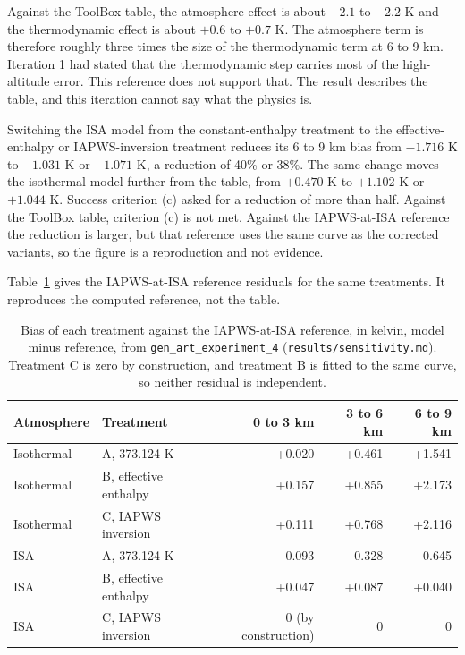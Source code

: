 \documentclass[11pt,letterpaper]{article}
\begin{document}
Against the ToolBox table, the atmosphere effect is about $-2.1$ to $-2.2$ K and the thermodynamic effect is about $+0.6$ to $+0.7$ K. The atmosphere term is therefore roughly three times the size of the thermodynamic term at 6 to 9 km. Iteration 1 had stated that the thermodynamic step carries most of the high-altitude error. This reference does not support that. The result describes the table, and this iteration cannot say what the physics is.

Switching the ISA model from the constant-enthalpy treatment to the effective-enthalpy or IAPWS-inversion treatment reduces its 6 to 9 km bias from $-1.716$ K to $-1.031$ K or $-1.071$ K, a reduction of 40\% or 38\%. The same change moves the isothermal model further from the table, from $+0.470$ K to $+1.102$ K or $+1.044$ K. Success criterion (c) asked for a reduction of more than half. Against the ToolBox table, criterion (c) is not met. Against the IAPWS-at-ISA reference the reduction is larger, but that reference uses the same curve as the corrected variants, so the figure is a reproduction and not evidence.

Table~\ref{tab:t11} gives the IAPWS-at-ISA reference residuals for the same treatments. It reproduces the computed reference, not the table.

\begin{table}[!htbp]
\centering\small
\caption{Bias of each treatment against the IAPWS-at-ISA reference, in kelvin, model minus reference, from \texttt{gen\_art\_experiment\_4} (\texttt{results/sensitivity.md}). Treatment C is zero by construction, and treatment B is fitted to the same curve, so neither residual is independent.}\label{tab:t11}
\begin{tabular}{llrrr}
\toprule
Atmosphere & Treatment & 0 to 3 km & 3 to 6 km & 6 to 9 km \\
\midrule
Isothermal & A, 373.124 K & +0.020 & +0.461 & +1.541 \\
Isothermal & B, effective enthalpy & +0.157 & +0.855 & +2.173 \\
Isothermal & C, IAPWS inversion & +0.111 & +0.768 & +2.116 \\
ISA & A, 373.124 K & -0.093 & -0.328 & -0.645 \\
ISA & B, effective enthalpy & +0.047 & +0.087 & +0.040 \\
ISA & C, IAPWS inversion & 0 (by construction) & 0 & 0 \\
\bottomrule
\end{tabular}
\end{table}
\end{document}
